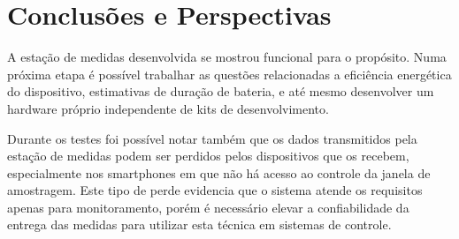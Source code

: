 \section{Conclusões e Perspectivas}



A estação de medidas desenvolvida se mostrou funcional para o propósito. Numa
próxima etapa é possível trabalhar as questões relacionadas a eficiência
energética do dispositivo, estimativas de duração de bateria, e até mesmo
desenvolver um hardware próprio independente de kits de desenvolvimento.

Durante os testes foi possível notar também que os dados transmitidos pela
estação de medidas podem ser perdidos pelos dispositivos que os recebem,
especialmente nos smartphones em que não há acesso ao controle da janela de
amostragem. Este tipo de perde evidencia que o sistema atende os requisitos
apenas para monitoramento, porém é necessário elevar a confiabilidade da entrega
das medidas para utilizar esta técnica em sistemas de controle.





